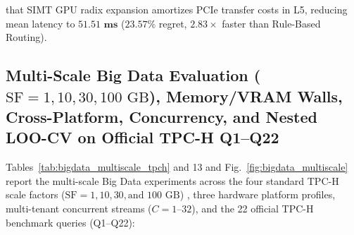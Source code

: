 \documentclass[10pt,a4paper]{article}
\begin{document}
\begin{enumerate}[leftmargin=1.5em,itemsep=2pt]
that SIMT GPU radix expansion amortizes PCIe transfer costs in L5, reducing mean latency to $\mathbf{51.51\text{ ms}}$ ($23.57\%$ regret, $\mathbf{2.83\times}$ faster than Rule-Based Routing).
\end{enumerate}

\subsection{Multi-Scale Big Data Evaluation ($\text{SF}=1, 10, 30, 100\text{ GB}$), Memory/VRAM Walls, Cross-Platform, Concurrency, and Nested LOO-CV on Official TPC-H Q1--Q22}
Tables~\ref{tab:bigdata_multiscale_tpch} and 13 and Fig.~\ref{fig:bigdata_multiscale} report the multi-scale Big Data experiments across the four standard TPC-H scale factors ($\text{SF}=1, 10, 30, \text{and } 100\text{ GB}$) \cite{tpc2022tpch, dreseler2020quantifying}, three hardware platform profiles, multi-tenant concurrent streams ($C=1\text{--}32$), and the 22 official TPC-H benchmark queries (Q1--Q22):
\end{document}
